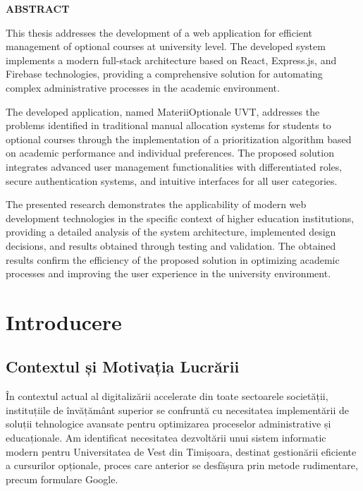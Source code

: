 \documentclass[12pt,a4paper]{report}
\begin{document}
\newpage
\thispagestyle{empty}
\vspace*{\fill}
\begin{center}
\textbf{ABSTRACT}
\end{center}

This thesis addresses the development of a web application for efficient management of optional courses at university level. The developed system implements a modern full-stack architecture based on React, Express.js, and Firebase technologies, providing a comprehensive solution for automating complex administrative processes in the academic environment.

The developed application, named MateriiOptionale UVT, addresses the problems identified in traditional manual allocation systems for students to optional courses through the implementation of a prioritization algorithm based on academic performance and individual preferences. The proposed solution integrates advanced user management functionalities with differentiated roles, secure authentication systems, and intuitive interfaces for all user categories.

The presented research demonstrates the applicability of modern web development technologies in the specific context of higher education institutions, providing a detailed analysis of the system architecture, implemented design decisions, and results obtained through testing and validation. The obtained results confirm the efficiency of the proposed solution in optimizing academic processes and improving the user experience in the university environment.

\vspace*{\fill}

\newpage
\tableofcontents
\newpage

\chapter{Introducere}

\section{Contextul și Motivația Lucrării}

În contextul actual al digitalizării accelerate din toate sectoarele societății, instituțiile de învățământ superior se confruntă cu necesitatea implementării de soluții tehnologice avansate pentru optimizarea proceselor administrative și educaționale. Am identificat necesitatea dezvoltării unui sistem informatic modern pentru Universitatea de Vest din Timișoara, destinat gestionării eficiente a cursurilor opționale, proces care anterior se desfășura prin metode rudimentare, precum formulare Google.
\end{document}
